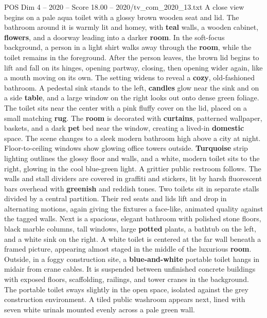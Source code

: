 \begin{textsample}{POS Dim 4 – 2020 – Score 18.00 – 2020/tv\_com\_2020\_13.txt}  \label{ex:f4_pos_007}
A close view begins on a pale aqua toilet with a glossy brown wooden seat and lid.
The bathroom around it is warmly lit and homey, with \textbf{teal} walls, a wooden cabinet, \textbf{flowers}, and a doorway leading into a darker \textbf{room}.
In the soft-focus background, a person in a light shirt walks away through the \textbf{room}, while the toilet remains in the foreground.
After the person leaves, the brown lid begins to lift and fall on its hinges, opening partway, closing, then opening wider again, like a mouth moving on its own.
The setting widens to reveal a \textbf{cozy}, old-fashioned bathroom.
A pedestal sink stands to the left, \textbf{candles} glow near the sink and on a side \textbf{table}, and a large window on the right looks out onto dense green foliage.
The toilet sits near the center with a pink fluffy cover on the lid, placed on a small matching \textbf{rug}.
The \textbf{room} is decorated with \textbf{curtains}, patterned wallpaper, baskets, and a dark \textbf{pet} bed near the window, creating a lived-in \textbf{domestic} space.
The scene changes to a sleek modern bathroom high above a city at night.
Floor-to-ceiling windows show glowing office towers outside. \textbf{Turquoise} strip lighting outlines the glossy floor and walls, and a white, modern toilet sits to the right, glowing in the cool blue-green light.
A grittier public restroom follows.
The walls and stall dividers are covered in graffiti and stickers, lit by harsh fluorescent bars overhead with \textbf{greenish} and reddish tones.
Two toilets sit in separate stalls divided by a central partition.
Their red seats and lids lift and drop in alternating motions, again giving the fixtures a face-like, animated quality against the tagged walls.
Next is a spacious, elegant bathroom with polished stone floors, black marble columns, tall windows, large \textbf{potted} plants, a bathtub on the left, and a white sink on the right.
A white toilet is centered at the far wall beneath a framed picture, appearing almost staged in the middle of the luxurious \textbf{room}.
Outside, in a foggy construction site, a \textbf{blue-and-white} portable toilet hangs in midair from crane cables.
It is suspended between unfinished concrete buildings with exposed floors, scaffolding, railings, and tower cranes in the background.
The portable toilet sways slightly in the open space, isolated against the grey construction environment.
A tiled public washroom appears next, lined with seven white urinals mounted evenly across a pale green wall.

\end{textsample}
